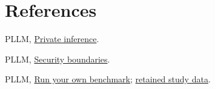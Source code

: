 \documentclass[10pt,letterpaper]{article}
\begin{document}
\begin{minipage}[t]{.485\textwidth}
\section*{References}
\fontsize{7.2}{8.5}\selectfont
[1] PLLM, \href{https://pllm.run/research/architecture/}{Private inference}.\par
[2] PLLM, \href{https://pllm.run/docs/security/}{Security boundaries}.\par
[3] PLLM, \href{https://pllm.run/research/reproduce/}{Run your own benchmark}; \href{https://pllm.run/downloads/current-runtime-2026-09-11.json}{retained study data}.

\end{minipage}
\end{document}
